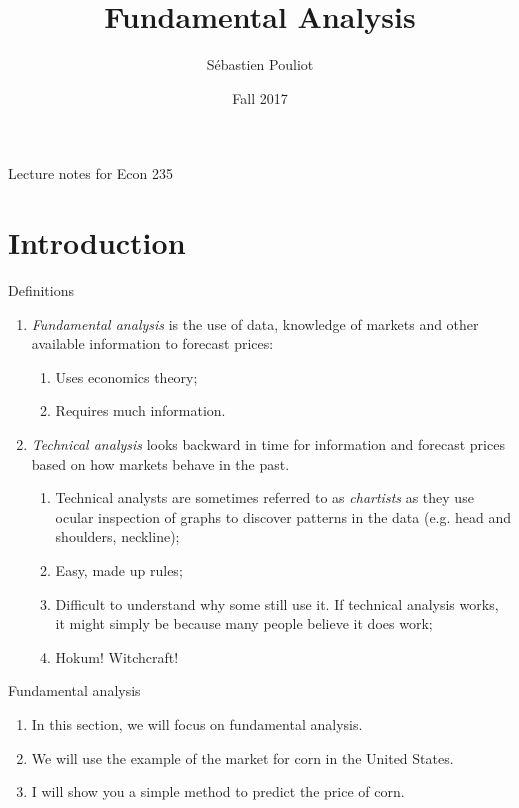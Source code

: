 \documentclass[table,xcolor=pdftex,dvipsnames, handout]{beamer}\usepackage[]{graphicx}\usepackage[]{color}
\title[Fundamental Analysis]{Fundamental Analysis}
\author[Pouliot]{S\'{e}bastien Pouliot}
\institute{Iowa State University}
\date{Fall 2017}
\begin{document}

\begin{frame}
\titlepage
\vspace{-0.4in}
\begin{center}
Lecture notes for Econ 235\\
\end{center}
\end{frame}

\section{Introduction}

\begin{frame}{Definitions}
\begin{enumerate}[label=\textbullet]
  \item \emph{Fundamental analysis} is the use of data, knowledge of markets and other available information to forecast prices:
    \begin{enumerate}[label=-]
         \item Uses economics theory;
         \item Requires much information.
    \end{enumerate}
  \item \emph{Technical analysis} looks backward in time for information and forecast prices based on how markets behave in the past.
    \begin{enumerate}[label=-]
         \item Technical analysts are sometimes referred to as \emph{chartists} as they use ocular inspection of graphs to discover patterns in the data (e.g. head and shoulders, neckline);
         \item Easy, made up rules;
         \item Difficult to understand why some still use it. If technical analysis works, it might simply be because many people believe it does work;
         \item Hokum! Witchcraft!
    \end{enumerate}
\end{enumerate}
\end{frame}


\begin{frame}{Fundamental analysis}
\begin{enumerate}[label=\textbullet]
  \item In this section, we will focus on fundamental analysis.
  \item We will use the example of the market for corn in the United States.
  \item I will show you a simple method to predict the price of corn.
\end{enumerate}
\end{frame}
\end{document}
